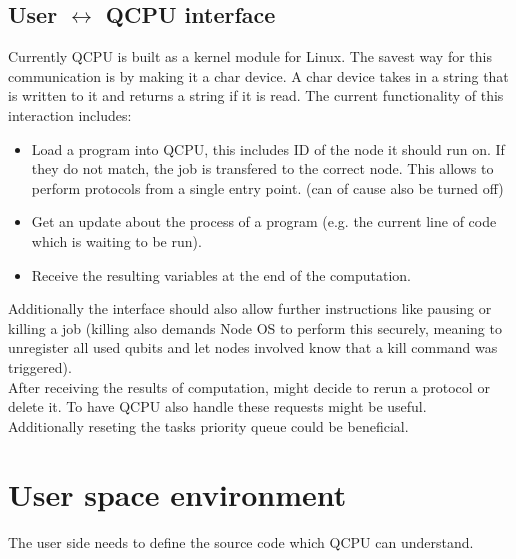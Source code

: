 \documentclass[]{article}
\begin{document}
\subsection{User $\leftrightarrow$ QCPU interface}
Currently QCPU is built as a kernel module for Linux. The savest way for this communication is by making it a char device. A char device takes in a string that is written to it and returns a string if it is read. The current functionality of this interaction includes:
\begin{itemize}
	\item Load a program into QCPU, this includes ID of the node it should run on. If they do not match, the job is transfered to the correct node. This allows to perform protocols from a single entry point. (can of cause also be turned off)
	\item Get an update about the process of a program (e.g. the current line of code which is waiting to be run).
	\item Receive the resulting variables at the end of the computation.
\end{itemize}
Additionally the interface should also allow further instructions like pausing or killing a job (killing also demands Node OS to perform this securely, meaning to unregister all used qubits and let nodes involved know that a kill command was triggered).\\
After receiving the results of computation, might decide to rerun a protocol or delete it. To have QCPU also handle these requests might be useful.\\
Additionally reseting the tasks priority queue could be beneficial.
\section{User space environment}
The user side needs to define the source code which QCPU can understand. 
\end{document}
